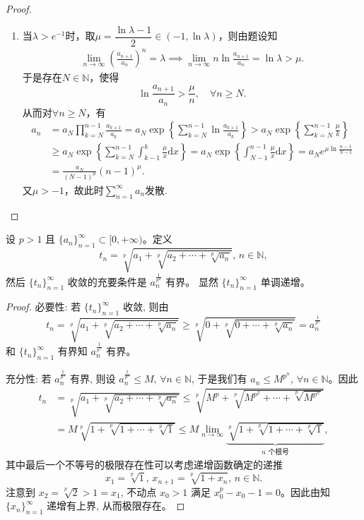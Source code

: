 \documentclass[../../main.tex]{subfiles}%
\begin{document}
\begin{proof}
\begin{enumerate}[(1)]
\item 当$\lambda > e^{-1}$时，取$\mu = \dfrac{\ln\lambda - 1}{2} \in (-1, \ln\lambda)$，则由题设知
\begin{align*}
\lim_{n\to\infty} \left( \frac{a_{n+1}}{a_n} \right)^n = \lambda \implies \lim_{n\to\infty} n\ln\frac{a_{n+1}}{a_n} = \ln\lambda > \mu.
\end{align*}
于是存在$N\in\mathbb{N}$，使得
$$\ln\frac{a_{n+1}}{a_n} > \frac{\mu}{n}, \quad \forall n\geqslant N.$$
从而对$\forall n\geqslant N$，有
\begin{align*}
a_n&=a_N\prod_{k=N}^{n-1}{\frac{a_{k+1}}{a_k}}=a_N\exp \left\{ \sum_{k=N}^{n-1}{\ln \frac{a_{k+1}}{a_k}} \right\} >a_N\exp \left\{ \sum_{k=N}^{n-1}{\frac{\mu}{k}} \right\} 
\\
&\geqslant a_N\exp \left\{ \sum_{k=N}^{n-1}{\int_{k-1}^k{\frac{\mu}{x}\mathrm{d}x}} \right\} =a_N\exp \left\{ \int_{N-1}^{n-1}{\frac{\mu}{x}\mathrm{d}x} \right\} =a_Ne^{\mu \ln \frac{n-1}{N-1}}
\\
&=\frac{a_N}{(N-1)^{\mu}}(n-1)^{\mu}.
\end{align*}
又$\mu > -1$，故此时$\sum\limits_{n=1}^{\infty} a_n$发散.
\end{enumerate}
\end{proof}

\begin{example}[Herschfeld判别法]

设 \( p > 1 \) 且 \( \{a_n\}_{n = 1}^{\infty} \subset [0, +\infty) \)。定义
\[
t_n = \sqrt[p]{a_1 + \sqrt[p]{a_2 + \cdots + \sqrt[p]{a_n}}}, \, n \in \mathbb{N},
\]
然后 \( \{t_n\}_{n = 1}^{\infty} \) 收敛的充要条件是 \( a_n^{\frac{1}{p^n}} \) 有界。
显然 \( \{t_n\}_{n = 1}^{\infty} \) 单调递增。
\end{example}
\begin{proof}

{\heiti 必要性:} 若 \( \{t_n\}_{n = 1}^{\infty} \) 收敛, 则由
\[
t_n = \sqrt[p]{a_1 + \sqrt[p]{a_2 + \cdots + \sqrt[p]{a_n}}} \geqslant \sqrt[p]{0 + \sqrt[p]{0 + \cdots + \sqrt[p]{a_n}}} = a_n^{\frac{1}{p^n}}
\]
和 \( \{t_n\}_{n = 1}^{\infty} \) 有界知 \( a_n^{\frac{1}{p^n}} \) 有界。

{\heiti 充分性:} 若 \( a_n^{\frac{1}{p^n}} \) 有界, 则设 \( a_n^{\frac{1}{p^n}} \leqslant M, \, \forall n \in \mathbb{N} \), 于是我们有 \( a_n \leqslant M^{p^n}, \, \forall n \in \mathbb{N} \)。因此
\begin{align*}
t_n &= \sqrt[p]{a_1 + \sqrt[p]{a_2 + \cdots + \sqrt[p]{a_n}}} \leqslant \sqrt[p]{M^{p} + \sqrt[p]{M^{p^2} + \cdots + \sqrt[p]{M^{p^n}}}} \\
&= M\sqrt[p]{1 + \sqrt[p]{1 + \cdots + \sqrt[p]{1}}} \leqslant M \lim_{n \to \infty} \underbrace{\sqrt[p]{1 + \sqrt[p]{1 + \cdots + \sqrt[p]{1}}}}_{n \text{ 个根号}},
\end{align*}
其中最后一个不等号的极限存在性可以考虑递增函数确定的递推
\[
x_1 = \sqrt[p]{1}, \, x_{n + 1} = \sqrt[p]{1 + x_n}, \, n \in \mathbb{N}.
\]
注意到 \( x_2 = \sqrt[p]{2} > 1 = x_1 \), 不动点 \( x_0 > 1 \) 满足 \( x_0^p - x_0 - 1 = 0 \)。因此由知 \( \{x_n\}_{n = 1}^{\infty} \) 递增有上界, 从而极限存在。
\end{proof}
\end{document}
